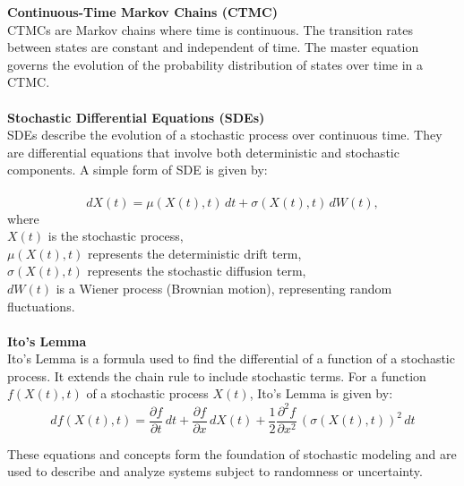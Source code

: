 \documentclass[12pt]{article}
\begin{document}
\textbf{Continuous-Time Markov Chains (CTMC)}\\
CTMCs are Markov chains where time is continuous. The transition rates between
states are constant and independent of time. The master equation governs the evolution
of the probability distribution of states over time in a CTMC.\\
\\
\textbf{Stochastic Differential Equations (SDEs)}\\
SDEs describe the evolution of a stochastic process over continuous time.
They are differential equations that involve both deterministic and stochastic components.
A simple form of SDE is given by:\\
\\
\begin{equation}
    dX(t) = \mu(X(t), t) \, dt + \sigma(X(t), t) \, dW(t),
\end{equation}
where\\
\( X(t) \) is the stochastic process,\\
\( \mu(X(t), t) \) represents the deterministic drift term,\\
\( \sigma(X(t), t) \) represents the stochastic diffusion term,\\
\( dW(t) \) is a Wiener process (Brownian motion), representing random fluctuations.\\
\\
\textbf{Ito's Lemma}\\
Ito's Lemma is a formula used to find the differential of a function of a stochastic
process. It extends the chain rule to include stochastic terms.
For a function \( f(X(t), t) \) of a stochastic process \( X(t) \), Ito's Lemma is given by:\\

\begin{equation}
    df(X(t), t) = \frac{\partial f}{\partial t} \, dt + \frac{\partial f}{\partial x} \, dX(t) + \frac{1}{2} \frac{\partial^2 f}{\partial x^2} \, (\sigma(X(t), t))^2 \, dt
\end{equation}

\noindent These equations and concepts form the foundation of stochastic modeling and are used to
describe and analyze systems subject to randomness or uncertainty.
\end{document}
